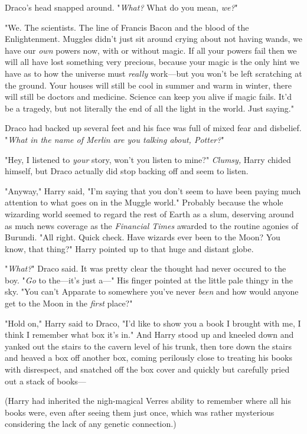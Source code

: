 Draco's head snapped around. "\emph{What?} What do you mean, \emph{we?}"

"We. The scientists. The line of Francis Bacon and the blood of the
Enlightenment. Muggles didn't just sit around crying about not having wands, we
have our \emph{own} powers now, with or without magic. If all your powers fail
then we will all have lost something very precious, because your magic is the
only hint we have as to how the universe must \emph{really} work---but you
won't be left scratching at the ground. Your houses will still be cool in
summer and warm in winter, there will still be doctors and medicine. Science
can keep you alive if magic fails. It'd be a tragedy, but not literally the end
of all the light in the world. Just saying."

Draco had backed up several feet and his face was full of mixed fear and
disbelief. "\emph{What in the name of Merlin are you talking about, Potter?}"

"Hey, I listened to \emph{your} story, won't you listen to mine?"
\emph{Clumsy,} Harry chided himself, but Draco actually did stop backing off
and seem to listen.

"Anyway," Harry said, "I'm saying that you don't seem to have been paying much
attention to what goes on in the Muggle world." Probably because the whole
wizarding world seemed to regard the rest of Earth as a slum, deserving around
as much news coverage as the \emph{Financial Times} awarded to the routine
agonies of Burundi. "All right. Quick check. Have wizards ever been to the
Moon? You know, that thing?" Harry pointed up to that huge and distant globe.

"\emph{What?}" Draco said. It was pretty clear the thought had never occured to
the boy. "\emph{Go} to the---it's just a---" His finger pointed at the little
pale thingy in the sky. "You can't Apparate to somewhere you've never
\emph{been} and how would anyone get to the Moon in the \emph{first} place?"

"Hold on," Harry said to Draco, "I'd like to show you a book I brought with me,
I think I remember what box it's in." And Harry stood up and kneeled down and
yanked out the stairs to the cavern level of his trunk, then tore down the
stairs and heaved a box off another box, coming perilously close to treating
his books with disrespect, and snatched off the box cover and quickly but
carefully pried out a stack of books---

(Harry had inherited the nigh-magical Verres ability to remember where all his
books were, even after seeing them just once, which was rather mysterious
considering the lack of any genetic connection.)

